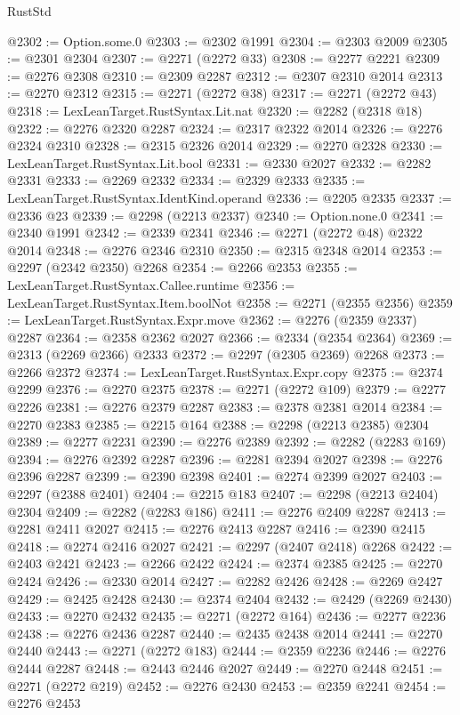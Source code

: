 \begin{lexlean}{RustStd}
\begin{coremodule}
@2302 := Option.some.{0}
@2303 := @2302 @1991
@2304 := @2303 @2009
@2305 := @2301 @2304
@2307 := @2271 (@2272 @33)
@2308 := @2277 @2221
@2309 := @2276 @2308
@2310 := @2309 @2287
@2312 := @2307 @2310 @2014
@2313 := @2270 @2312
@2315 := @2271 (@2272 @38)
@2317 := @2271 (@2272 @43)
@2318 := LexLeanTarget.RustSyntax.Lit.nat
@2320 := @2282 (@2318 @18)
@2322 := @2276 @2320 @2287
@2324 := @2317 @2322 @2014
@2326 := @2276 @2324 @2310
@2328 := @2315 @2326 @2014
@2329 := @2270 @2328
@2330 := LexLeanTarget.RustSyntax.Lit.bool
@2331 := @2330 @2027
@2332 := @2282 @2331
@2333 := @2269 @2332
@2334 := @2329 @2333
@2335 := LexLeanTarget.RustSyntax.IdentKind.operand
@2336 := @2205 @2335
@2337 := @2336 @23
@2339 := @2298 (@2213 @2337)
@2340 := Option.none.{0}
@2341 := @2340 @1991
@2342 := @2339 @2341
@2346 := @2271 (@2272 @48) @2322 @2014
@2348 := @2276 @2346 @2310
@2350 := @2315 @2348 @2014
@2353 := @2297 (@2342 @2350) @2268
@2354 := @2266 @2353
@2355 := LexLeanTarget.RustSyntax.Callee.runtime
@2356 := LexLeanTarget.RustSyntax.Item.boolNot
@2358 := @2271 (@2355 @2356)
@2359 := LexLeanTarget.RustSyntax.Expr.move
@2362 := @2276 (@2359 @2337) @2287
@2364 := @2358 @2362 @2027
@2366 := @2334 (@2354 @2364)
@2369 := @2313 (@2269 @2366) @2333
@2372 := @2297 (@2305 @2369) @2268
@2373 := @2266 @2372
@2374 := LexLeanTarget.RustSyntax.Expr.copy
@2375 := @2374 @2299
@2376 := @2270 @2375
@2378 := @2271 (@2272 @109)
@2379 := @2277 @2226
@2381 := @2276 @2379 @2287
@2383 := @2378 @2381 @2014
@2384 := @2270 @2383
@2385 := @2215 @164
@2388 := @2298 (@2213 @2385) @2304
@2389 := @2277 @2231
@2390 := @2276 @2389
@2392 := @2282 (@2283 @169)
@2394 := @2276 @2392 @2287
@2396 := @2281 @2394 @2027
@2398 := @2276 @2396 @2287
@2399 := @2390 @2398
@2401 := @2274 @2399 @2027
@2403 := @2297 (@2388 @2401)
@2404 := @2215 @183
@2407 := @2298 (@2213 @2404) @2304
@2409 := @2282 (@2283 @186)
@2411 := @2276 @2409 @2287
@2413 := @2281 @2411 @2027
@2415 := @2276 @2413 @2287
@2416 := @2390 @2415
@2418 := @2274 @2416 @2027
@2421 := @2297 (@2407 @2418) @2268
@2422 := @2403 @2421
@2423 := @2266 @2422
@2424 := @2374 @2385
@2425 := @2270 @2424
@2426 := @2330 @2014
@2427 := @2282 @2426
@2428 := @2269 @2427
@2429 := @2425 @2428
@2430 := @2374 @2404
@2432 := @2429 (@2269 @2430)
@2433 := @2270 @2432
@2435 := @2271 (@2272 @164)
@2436 := @2277 @2236
@2438 := @2276 @2436 @2287
@2440 := @2435 @2438 @2014
@2441 := @2270 @2440
@2443 := @2271 (@2272 @183)
@2444 := @2359 @2236
@2446 := @2276 @2444 @2287
@2448 := @2443 @2446 @2027
@2449 := @2270 @2448
@2451 := @2271 (@2272 @219)
@2452 := @2276 @2430
@2453 := @2359 @2241
@2454 := @2276 @2453

\end{coremodule}
\end{lexlean}
